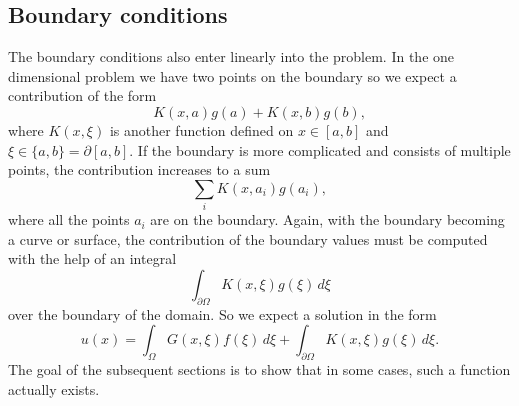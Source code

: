 \subsection{Boundary conditions}
The boundary conditions also enter linearly into the problem.
In the one dimensional problem we have two points on the boundary
so we expect a contribution of the form
\[
K(x,a) g(a) + K(x,b)g(b),
\]
where $K(x,\xi)$ is another function defined on $x\in [a,b]$ and
$\xi \in\{a,b\}=\partial[a,b]$.
If the boundary is more complicated and consists of multiple points,
the contribution increases to a sum
\[
\sum_{i}K(x,a_i)g(a_i),
\]
where all the points $a_i$ are on the boundary.
Again, with the boundary becoming a curve or surface, the
contribution of the boundary values must be computed with
the help of an integral
\[
\int_{\partial\Omega}K(x,\xi)g(\xi)\,d\xi
\]
over the boundary of the domain.
So we expect a solution in the form
\begin{equation}
u(x)=\int_{\Omega} G(x,\xi)f(\xi)\,d\xi + \int_{\partial\Omega} K(x,\xi)g(\xi)\,d\xi.
\label{greenformula}
\end{equation}
The goal of the subsequent sections is to show that in some cases,
such a function actually exists.

